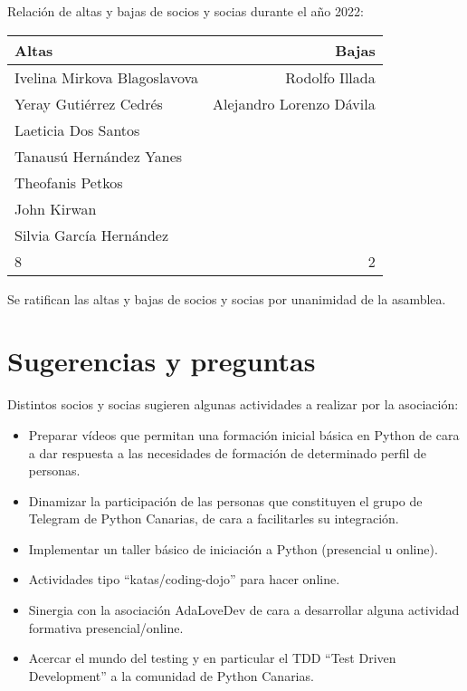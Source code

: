 \documentclass[a4paper,12pt]{article}
\begin{document}
Relación de altas y bajas de socios y socias durante el año 2022:

\begin{center}
    \begin{tabular}{ | l | r | }
        \hline
        \textbf{Altas} & \textbf{Bajas} \\ 
        \hline
        \hline
        Ivelina Mirkova Blagoslavova & Rodolfo Illada \\  
        \hline
        Yeray Gutiérrez Cedrés & Alejandro Lorenzo Dávila \\  
        \hline
        Laeticia Dos Santos & \\  
        \hline
        Tanausú Hernández Yanes & \\  
        \hline
        Theofanis Petkos & \\  
        \hline
        John Kirwan & \\  
        \hline
        Silvia García Hernández & \\  
        \hline
        \hline
        8 & 2 \\  
        \hline
    \end{tabular}
\end{center}

Se ratifican las altas y bajas de socios y socias por unanimidad de la asamblea.

\section{Sugerencias y preguntas}

Distintos socios y socias sugieren algunas actividades a realizar por la asociación:

\begin{itemize}
    \item Preparar vídeos que permitan una formación inicial básica en Python de cara a dar respuesta a las necesidades de formación de determinado perfil de personas.
    \item Dinamizar la participación de las personas que constituyen el grupo de Telegram de Python Canarias, de cara a facilitarles su integración.
    \item Implementar un taller básico de iniciación a Python (presencial u online).
    \item Actividades tipo ``katas/coding-dojo'' para hacer online.
    \item Sinergia con la asociación AdaLoveDev de cara a desarrollar alguna actividad formativa presencial/online.
    \item Acercar el mundo del testing y en particular el TDD ``Test Driven Development'' a la comunidad de Python Canarias.
\end{itemize}
\end{document}
